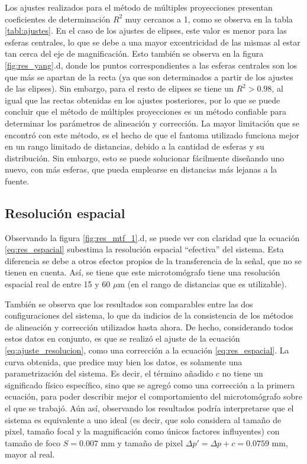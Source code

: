 Los ajustes realizados para el método de múltiples proyecciones presentan coeficientes de determinación
$R^2$ muy cercanos a 1, como se observa en la tabla \ref{tabl:ajustes}. En el caso de los ajustes de
elipses, este valor es menor para las esferas centrales, lo que se debe a una mayor excentricidad de
las mismas al estar tan cerca del eje de magnificación. Esto también se observa en la figura \ref{fig:res_yang}.d,
donde los puntos correspondientes a las esferas centrales son los que más se apartan de la recta (ya que
son determinados a partir de los ajustes de las elipses). Sin embargo, para el resto de elipses se tiene
un $R^2>0.98$, al igual que las rectas obtenidas en los ajustes posteriores, por lo que se puede concluir
que el método de múltiples proyecciones es un método confiable para determinar los parámetros de alineación
y corrección. La mayor limitación que se encontró con este método, es el hecho de que el fantoma utilizado
funciona mejor en un rango limitado de distancias, debido a la cantidad de esferas y su distribución. Sin
embargo, esto se puede solucionar fácilmente diseñando uno nuevo, con más esferas, que pueda emplearse
en distancias más lejanas a la fuente.

\subsection{Resolución espacial}

Observando la figura \ref{fig:res_mtf_1}.d, se puede ver con claridad que la ecuación \ref{eq:res_espacial}
subestima la resolución espacial ``efectiva'' del sistema. Esta diferencia se debe a otros efectos
propios de la transferencia de la señal, que no se tienen en cuenta. Así, se tiene que este
microtomógrafo tiene una resolución espacial real de entre 15 y 60 $\mu$m (en el rango de distancias que
es utilizable).

También se observa que los resultados son comparables entre las dos configuraciones del sistema, lo
que da indicios de la consistencia de los métodos de alineación y corrección utilizados hasta ahora.
De hecho, considerando todos estos datos en conjunto, es que se realizó el ajuste de la ecuación
\ref{eq:ajuste_resolucion}, como una corrección a la ecuación \ref{eq:res_espacial}. La curva obtenida,
que predice muy bien los datos, es solamente una parametrización del sistema. Es decir, el término añadido
$c$ no tiene un significado físico específico, sino que se agregó como una corrección a la
primera ecuación, para poder describir mejor el comportamiento del microtomógrafo sobre el que se
trabajó. Aún así, observando los resultados podría interpretarse que el sistema es equivalente a uno
ideal (es decir, que solo considera al tamaño de pixel, tamaño focal y la magnificación como únicos
factores influyentes) con tamaño de foco $S=0.007$ mm y tamaño de pixel $\Delta p' = \Delta p + c = 0.0759$ mm, mayor al real.

